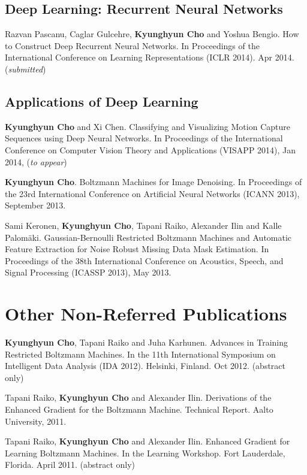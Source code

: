 \documentclass[11pt, oneside]{essay}
\begin{document}
\subsection{Deep Learning: Recurrent Neural Networks}

Razvan Pascanu, Caglar Gulcehre, \textbf{Kyunghyun Cho} and Yoshua Bengio.
How to Construct Deep Recurrent Neural Networks. 
In Proceedings of the International Conference on Learning
Representations (ICLR 2014). Apr 2014. (\textit{submitted})


\subsection{Applications of Deep Learning}

\textbf{Kyunghyun Cho} and Xi Chen.  Classifying and
Visualizing Motion Capture Sequences using Deep Neural
Networks.  In Proceedings of the International Conference on
Computer Vision Theory and Applications (VISAPP 2014), Jan
2014, (\textit{to appear})

\textbf{Kyunghyun Cho}. Boltzmann Machines for Image Denoising. In
Proceedings of the 23rd International Conference on
Artificial Neural Networks (ICANN 2013), September 2013.

Sami Keronen, \textbf{Kyunghyun Cho}, Tapani Raiko, Alexander Ilin
and Kalle Palom\"aki. Gaussian-Bernoulli Restricted Boltzmann
Machines and Automatic Feature Extraction for Noise Robust
Missing Data Mask Estimation. In Proceedings of the 38th
International Conference on Acoustics, Speech, and Signal
Processing (ICASSP 2013), May 2013.




\section{Other Non-Referred Publications}

\textbf{Kyunghyun Cho}, Tapani Raiko and Juha Karhunen.
Advances in Training Restricted Boltzmann Machines.
In the 11th International Symposium on Intelligent Data
Analysis (IDA 2012). Helsinki, Finland. Oct 2012. (abstract
only)

Tapani Raiko, \textbf{Kyunghyun Cho} and Alexander Ilin.
Derivations of the Enhanced Gradient for the Boltzmann
Machine.  Technical Report. Aalto University, 2011.

Tapani Raiko, \textbf{Kyunghyun Cho} and Alexander Ilin.
Enhanced Gradient for Learning Boltzmann Machines.
In the Learning Workshop. Fort Lauderdale, Florida. April
2011. (abstract only)
\end{document}

